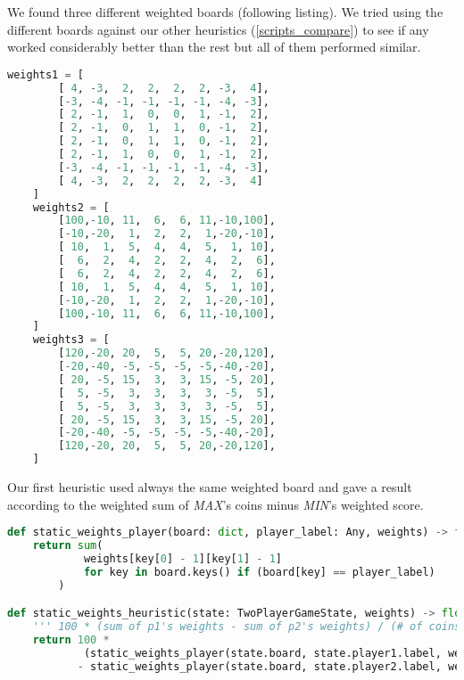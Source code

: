 \documentclass{article}
\begin{document}
We found three different weighted boards (following listing). We tried using the different boards against our other heuristics (\ref{scripts_compare})  to see if any worked considerably better than the rest but all of them performed similar. 



\begin{lstlisting}[captionpos=t,language=python,linewidth=1\textwidth,caption={Our 3 weighted boards: from \cite{washington1} (the first two), and \cite{CaseStudy} (the third).}]
    weights1 = [
        [ 4, -3,  2,  2,  2,  2, -3,  4],
        [-3, -4, -1, -1, -1, -1, -4, -3],
        [ 2, -1,  1,  0,  0,  1, -1,  2],
        [ 2, -1,  0,  1,  1,  0, -1,  2],
        [ 2, -1,  0,  1,  1,  0, -1,  2],
        [ 2, -1,  1,  0,  0,  1, -1,  2],
        [-3, -4, -1, -1, -1, -1, -4, -3],
        [ 4, -3,  2,  2,  2,  2, -3,  4]
    ]
    weights2 = [
        [100,-10, 11,  6,  6, 11,-10,100],
        [-10,-20,  1,  2,  2,  1,-20,-10],
        [ 10,  1,  5,  4,  4,  5,  1, 10],
        [  6,  2,  4,  2,  2,  4,  2,  6],
        [  6,  2,  4,  2,  2,  4,  2,  6],
        [ 10,  1,  5,  4,  4,  5,  1, 10],
        [-10,-20,  1,  2,  2,  1,-20,-10],
        [100,-10, 11,  6,  6, 11,-10,100],
    ]
    weights3 = [
        [120,-20, 20,  5,  5, 20,-20,120],
        [-20,-40, -5, -5, -5, -5,-40,-20],
        [ 20, -5, 15,  3,  3, 15, -5, 20],
        [  5, -5,  3,  3,  3,  3, -5,  5],
        [  5, -5,  3,  3,  3,  3, -5,  5],
        [ 20, -5, 15,  3,  3, 15, -5, 20],
        [-20,-40, -5, -5, -5, -5,-40,-20],
        [120,-20, 20,  5,  5, 20,-20,120],
    ]
    \end{lstlisting}\label{weighted_boards}


Our first heuristic used always the same weighted board and gave a result according to the weighted sum of \textit{MAX}'s coins minus \textit{MIN}'s weighted score.

\begin{lstlisting}[language=python, caption = Weighting the board,captionpos=t]
def static_weights_player(board: dict, player_label: Any, weights) -> float:
    return sum(
            weights[key[0] - 1][key[1] - 1]
            for key in board.keys() if (board[key] == player_label)
        )

def static_weights_heuristic(state: TwoPlayerGameState, weights) -> float:
    ''' 100 * (sum of p1's weights - sum of p2's weights) / (# of coins in the board) '''
    return 100 *                                                                       \
            (static_weights_player(state.board, state.player1.label, weights)          \
           - static_weights_player(state.board, state.player2.label, weights)) / len(state.board) 
\end{lstlisting}
\end{document}
